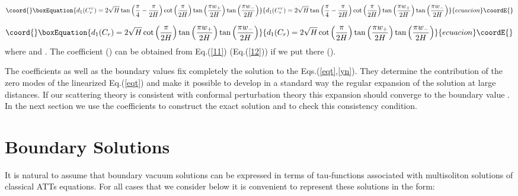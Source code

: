 \documentclass[a4paper,12pt,titlepage,final]{article}
\begin{document}
\begin{equation}\coord{}\boxEquation{
d_{1}(C_{r}^{\vee })=2\sqrt{H}\tan \left( \frac{\pi }{4}-\frac{\pi }{2H}
\right) \cot \left( \frac{\pi }{2H}\right) \tan \left( \frac{\pi w_{+}}{2H}
\right) \tan \left( \frac{\pi w_{-}}{2H}\right)  \label{11}
}{
d_{1}(C_{r}^{\vee })=2\sqrt{H}\tan \left( \frac{\pi }{4}-\frac{\pi }{2H}
\right) \cot \left( \frac{\pi }{2H}\right) \tan \left( \frac{\pi w_{+}}{2H}
\right) \tan \left( \frac{\pi w_{-}}{2H}\right)  }{ecuacion}\coordE{}\end{equation}

\begin{equation}\coord{}\boxEquation{
d_{1}(C_{r})=2\sqrt{H}\cot \left( \frac{\pi }{2H}\right)
\tan \left( \frac{\pi w_{+}}{2H}\right)
\tan \left( \frac{\pi w_{-}}{2H}\right)  \label{12}
}{
d_{1}(C_{r})=2\sqrt{H}\cot \left( \frac{\pi }{2H}\right)
\tan \left( \frac{\pi w_{+}}{2H}\right)
\tan \left( \frac{\pi w_{-}}{2H}\right)  }{ecuacion}\coordE{}\end{equation}
where \coordHE{} and \coordHE{}. The coefficient
\coordHE{} (\coordHE{}) can be obtained from Eq.(\ref{11})
(Eq.(\ref{12})) if we put there \coordHE{} (\coordHE{}).

The coefficients \coordHE{} as well as the boundary values \coordHE{} fix
completely the solution to the Eqs.(\ref{eqt},\ref{yn}). They determine the
contribution of the zero modes of the linearized Eq.(\ref{eqt}) and make it
possible to develop in a standard way the regular expansion of the solution
\coordHE{} at large distances. If our scattering theory is consistent with
conformal perturbation theory this expansion should converge to the boundary
value \coordHE{}. In the next section we use the coefficients \coordHE{} to
construct the exact solution and to check this consistency condition.

\section{Boundary Solutions}

It is natural to assume that boundary vacuum solutions can be expressed in
terms of tau-functions associated with multisoliton solutions of classical
ATTs equations. For all cases that we consider below it is convenient to
represent these solutions in the form:
\end{document}
